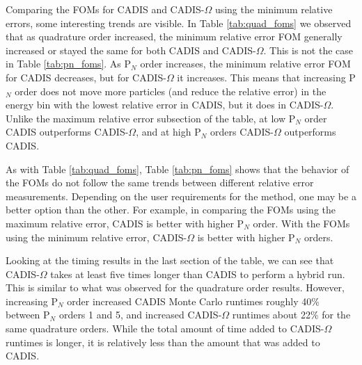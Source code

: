 Comparing the FOMs for CADIS and CADIS-$\Omega$ using the minimum relative
errors, some interesting trends are visible. In Table \ref{tab:quad_foms} we
observed that as quadrature order increased, the minimum relative error FOM
generally increased or stayed the same for both CADIS and
CADIS-$\Omega$. This is not the case in Table \ref{tab:pn_foms}. As P$_N$ order
increases, the minimum relative error FOM for CADIS decreases, but for
CADIS-$\Omega$ it increases. This means that increasing P$_N$ order does not
move more particles (and reduce the relative error) in the energy bin with the
lowest relative error in CADIS, but it does in CADIS-$\Omega$. Unlike the
maximum relative error subsection of the table, at low P$_N$ order CADIS
outperforms CADIS-$\Omega$, and at high P$_N$ orders CADIS-$\Omega$ outperforms
CADIS.

As with Table \ref{tab:quad_foms}, Table \ref{tab:pn_foms} shows that the
behavior of the FOMs do not follow the same trends between different relative
error measurements. Depending on the user requirements for the method, one may
be a better option than the other. For example, in comparing the FOMs using the
maximum relative error, CADIS is better with higher P$_N$ order. With the FOMs
using the minimum relative error, CADIS-$\Omega$ is better with higher P$_N$
orders.

Looking at the timing results in the last
section of the table, we can see that CADIS-$\Omega$ takes at least five times
longer than CADIS to perform a hybrid run. This is similar to what was observed
for the quadrature order results. However, increasing P$_N$ order increased
CADIS Monte Carlo runtimes roughly 40\% between P$_N$ orders 1 and 5, and
increased CADIS-$\Omega$ runtimes about 22\% for the same quadrature orders.
While the total amount of time added to CADIS-$\Omega$ runtimes is longer, it is
relatively less than the amount that was added to CADIS.

